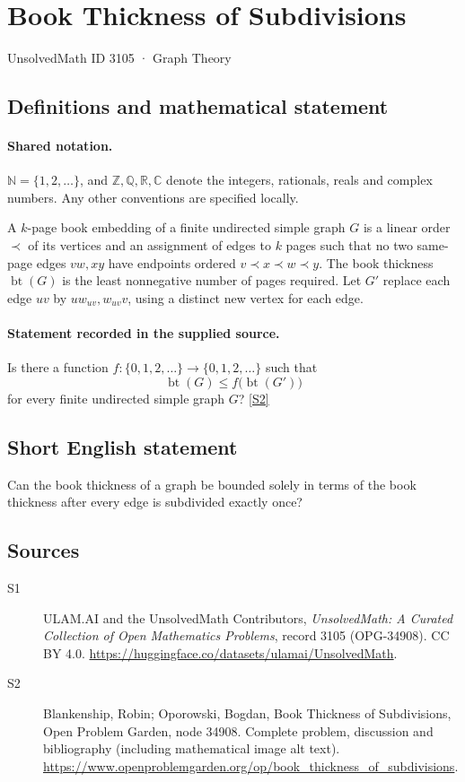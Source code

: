 \documentclass[11pt]{book}
\newcommand{\sref}[2]{\hyperlink{source:#1:#2}{[S#2]}}
\begin{document}
\setcounter{section}{3104}
\section{Book Thickness of Subdivisions}\label{3105}
{\small\sffamily UnsolvedMath ID 3105 · Graph Theory}
\subsection{Definitions and mathematical statement}

\paragraph{Shared notation.}$\mathbb N=\{1,2,\ldots\}$, and $\mathbb Z,\mathbb Q,\mathbb R,\mathbb C$ denote the integers, rationals, reals and complex numbers. Any other conventions are specified locally.


A $k$-page book embedding of a finite undirected simple graph $G$ is a linear order $\prec$ of its vertices and an assignment of edges to $k$ pages such that no two same-page edges $vw,xy$ have endpoints ordered $v\prec x\prec w\prec y$. The book thickness $\operatorname{bt}(G)$ is the least nonnegative number of pages required. Let $G'$ replace each edge $uv$ by $u w_{uv},w_{uv}v$, using a distinct new vertex for each edge.
\paragraph{Statement recorded in the supplied source.}
Is there a function $f:\{0,1,2,\ldots\}\to\{0,1,2,\ldots\}$ such that
\[\operatorname{bt}(G)\leq f\bigl(\operatorname{bt}(G')\bigr)\]
for every finite undirected simple graph $G$? \sref{3105}{2}
\subsection{Short English statement}
Can the book thickness of a graph be bounded solely in terms of the book thickness after every edge is subdivided exactly once?
\subsection{Sources}
\begin{description}
\item[\hypertarget{source:3105:1}{S1}] ULAM.AI and the UnsolvedMath Contributors, \emph{UnsolvedMath: A Curated Collection of Open Mathematics Problems}, record 3105 (OPG-34908). CC BY 4.0. \url{https://huggingface.co/datasets/ulamai/UnsolvedMath}.
\item[\hypertarget{source:3105:2}{S2}] Blankenship, Robin; Oporowski, Bogdan, Book Thickness of Subdivisions, Open Problem Garden, node 34908. Complete problem, discussion and bibliography (including mathematical image alt text). \url{https://www.openproblemgarden.org/op/book_thickness_of_subdivisions}.
\end{description}
\label{end:3105}
\end{document}
